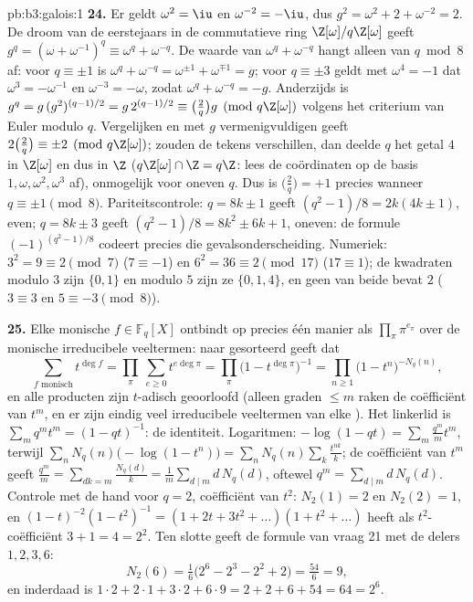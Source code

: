 \begin{solution}{pb:b3:galois:1}
\textbf{24.} Er geldt $\omega^2 = \iu$ en $\omega^{-2} = -\iu$,
dus $g^2 = \omega^2 + 2 + \omega^{-2} = 2$. De droom van de
eerstejaars in de commutatieve ring $\Z[\omega]/q\Z[\omega]$ geeft
$g^q = (\omega + \omega^{-1})^q \equiv \omega^q + \omega^{-q}$. De
waarde van $\omega^q + \omega^{-q}$ hangt alleen van $q \bmod 8$
af: voor $q \equiv \pm1$ is $\omega^q + \omega^{-q} =
\omega^{\pm1} + \omega^{\mp1} = g$; voor $q \equiv \pm3$ geldt met
$\omega^4 = -1$ dat $\omega^{3} = -\omega^{-1}$ en $\omega^{-3} =
-\omega$, zodat $\omega^q + \omega^{-q} = -g$. Anderzijds is $g^q
= g\,(g^2)^{(q-1)/2} = g\,2^{(q-1)/2} \equiv \bigl(\frac2q\bigr)g
\pmod{q\Z[\omega]}$ volgens het criterium van Euler modulo $q$.
Vergelijken en met $g$ vermenigvuldigen geeft
$2\bigl(\frac2q\bigr) \equiv \pm2 \pmod{q\Z[\omega]}$; zouden de
tekens verschillen, dan deelde $q$ het getal $4$ in $\Z[\omega]$
en dus in $\Z$ ($q\Z[\omega] \cap \Z = q\Z$: lees de coördinaten
op de basis $1, \omega, \omega^2, \omega^3$ af), onmogelijk voor
oneven $q$. Dus is $\bigl(\frac2q\bigr) = +1$ precies wanneer $q
\equiv \pm1 \pmod 8$. Pariteitscontrole: $q = 8k \pm 1$ geeft
$(q^2 - 1)/8 = 2k(4k \pm 1)$, even; $q = 8k \pm 3$ geeft $(q^2 -
1)/8 = 8k^2 \pm 6k + 1$, oneven: de formule $(-1)^{(q^2-1)/8}$
codeert precies die gevalsonderscheiding. Numeriek: $3^2 = 9
\equiv 2 \pmod 7$ ($7 \equiv -1$) en $6^2 = 36 \equiv 2 \pmod{17}$
($17 \equiv 1$); de kwadraten modulo $3$ zijn $\{0, 1\}$ en modulo
$5$ zijn ze $\{0, 1, 4\}$, en geen van beide bevat $2$ ($3 \equiv
3$ en $5 \equiv -3 \pmod 8$).

\textbf{25.} Elke monische $f \in \mathbb F_q[X]$ ontbindt op
precies één manier als $\prod_\pi\pi^{e_\pi}$ over de monische
irreducibele veeltermen: naar  gesorteerd geeft dat
\[
\sum_{f \text{ monisch}}t^{\deg f}
= \prod_\pi\ \sum_{e \geq 0}t^{e\deg\pi}
= \prod_\pi\bigl(1 - t^{\deg\pi}\bigr)^{-1}
= \prod_{n \geq 1}\bigl(1 - t^n\bigr)^{-N_q(n)},
\]
en alle producten zijn $t$-adisch geoorloofd (alleen graden $\leq
m$ raken de coëfficiënt van $t^m$, en er zijn eindig veel
irreducibele veeltermen van elke ). Het linkerlid is $\sum_m
q^mt^m = (1 - qt)^{-1}$: de identiteit. Logaritmen: $-\log(1 - qt)
= \sum_m\frac{q^m}mt^m$, terwijl $\sum_nN_q(n)\bigl(-\log(1 -
t^n)\bigr) = \sum_nN_q(n)\sum_k\frac{t^{nk}}k$; de coëfficiënt van
$t^m$ geeft $\frac{q^m}m = \sum_{dk = m} \frac{N_q(d)}k =
\frac1m\sum_{d \mid m}d\,N_q(d)$, oftewel $q^m = \sum_{d\mid
m}d\,N_q(d)$. Controle met de hand voor $q = 2$, coëfficiënt van
$t^2$: $N_2(1) = 2$ en $N_2(2) = 1$, en $(1 - t)^{-2}(1 -
t^2)^{-1} = (1 + 2t + 3t^2 + \dots)(1 + t^2 + \dots)$ heeft als
$t^2$-coëfficiënt $3 + 1 = 4 = 2^2$. Ten slotte geeft de formule
van vraag 21 met de delers $1, 2, 3, 6$:
\[
N_2(6) = \tfrac16\bigl(2^6 - 2^3 - 2^2 + 2\bigr)
= \tfrac{54}6 = 9,
\]
en inderdaad is $1\cdot2 + 2\cdot1 + 3\cdot2 + 6\cdot9 = 2 + 2 + 6
+ 54 = 64 = 2^6$.
\end{solution}
